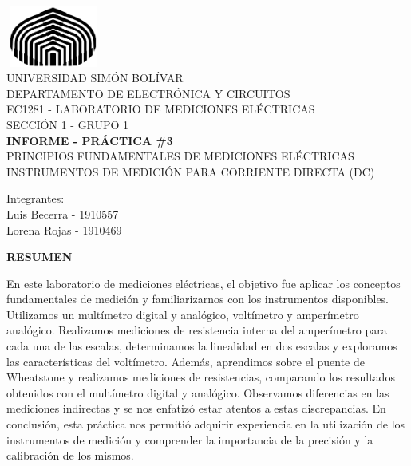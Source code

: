 \documentclass[12pt]{article}
\begin{document}
	
	\thispagestyle{empty}
	
	\begin{center}
		\includegraphics[width=3.1cm,height=2cm]{logo}\\
		UNIVERSIDAD SIMÓN BOLÍVAR\\
		DEPARTAMENTO DE ELECTRÓNICA Y CIRCUITOS\\
		EC1281 - LABORATORIO DE MEDICIONES ELÉCTRICAS\\
		SECCIÓN 1 - GRUPO 1\\
		
		\vspace{7cm}
		\textbf{\Large INFORME - PRÁCTICA \#3}\\
		PRINCIPIOS FUNDAMENTALES DE MEDICIONES ELÉCTRICAS INSTRUMENTOS DE MEDICIÓN PARA CORRIENTE DIRECTA (DC)\\
	\end{center}
	
	\begin{flushleft}
		\vspace{8cm}
		\hfill Integrantes:\\
		\hfill {\large Luis Becerra - 1910557}\\
		\hfill {\large Lorena Rojas - 1910469}\\
	\end{flushleft}
	
	\newpage
	
	
	\begin{center}
		\textbf{\large RESUMEN}\\
	\end{center}
	
	En este laboratorio de mediciones eléctricas, el objetivo fue aplicar los conceptos fundamentales de medición y familiarizarnos con los instrumentos disponibles. Utilizamos un multímetro digital y analógico, voltímetro y amperímetro analógico. Realizamos mediciones de resistencia interna del amperímetro para cada una de las escalas, determinamos la linealidad en dos escalas y exploramos las características del voltímetro. Además, aprendimos sobre el puente de Wheatstone y realizamos mediciones de resistencias, comparando los resultados obtenidos con el multímetro digital y analógico. Observamos diferencias en las mediciones indirectas y se nos enfatizó estar atentos a estas discrepancias. En conclusión, esta práctica nos permitió adquirir experiencia en la utilización de los instrumentos de medición y comprender la importancia de la precisión y la calibración de los mismos.\\
		
\end{document}
